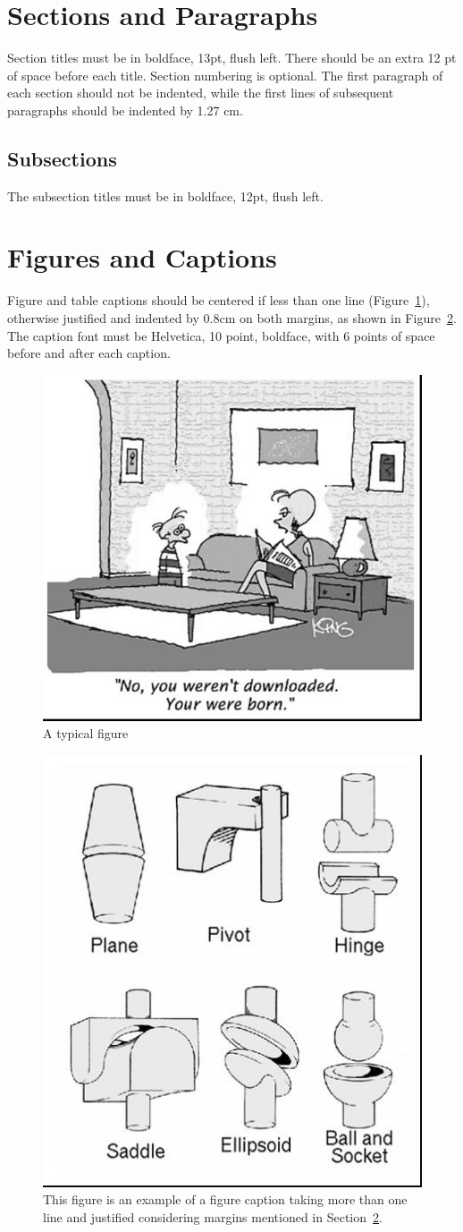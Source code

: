 \documentclass[12pt]{article}
\begin{document}
\section{Sections and Paragraphs}

Section titles must be in boldface, 13pt, flush left. There should be an extra
12 pt of space before each title. Section numbering is optional. The first
paragraph of each section should not be indented, while the first lines of
subsequent paragraphs should be indented by 1.27 cm.

\subsection{Subsections}

The subsection titles must be in boldface, 12pt, flush left.

\section{Figures and Captions}\label{sec:figs}


Figure and table captions should be centered if less than one line
(Figure~\ref{fig:exampleFig1}), otherwise justified and indented by 0.8cm on
both margins, as shown in Figure~\ref{fig:exampleFig2}. The caption font must
be Helvetica, 10 point, boldface, with 6 points of space before and after each
caption.

\begin{figure}[ht]
\centering
\includegraphics[width=.5\textwidth]{Figuras/fig1.jpg}
\caption{A typical figure}
\label{fig:exampleFig1}
\end{figure}

\begin{figure}[ht]
\centering
\includegraphics[width=.3\textwidth]{Figuras/fig2.jpg}
\caption{This figure is an example of a figure caption taking more than one
  line and justified considering margins mentioned in Section~\ref{sec:figs}.}
\label{fig:exampleFig2}
\end{figure}
\end{document}
